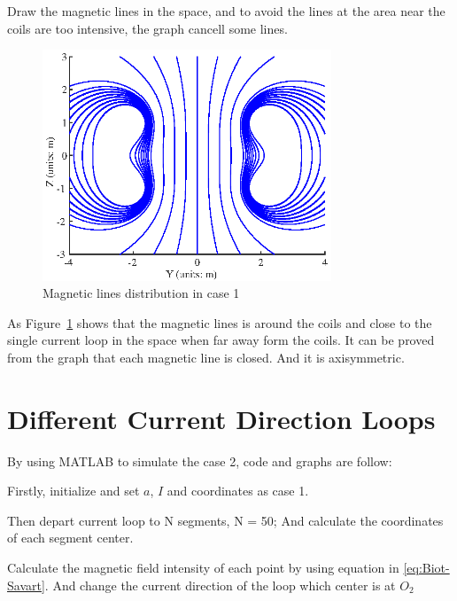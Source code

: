 \documentclass[10pt, journal, final]{IEEEtran}
\begin{document}
Draw the magnetic lines in the space, and to avoid the lines at the area near the coils are too intensive, 
the graph cancell some lines.


\begin{figure}[htbp]
    \centering
    \includegraphics[width = 3.4in]{figures-3/work1.3.eps}
    \caption{Magnetic lines distribution in case 1}
    \label{fig:1.3}
\end{figure}
As Figure~\ref{fig:1.3} shows that the magnetic lines is around the coils and close to the single current loop in the space
when far away form the coils. It can be proved from the graph that each magnetic line is closed. And it is axisymmetric.

\section{
  Different Current Direction Loops
 }
\label{sec: Diff Direction}
By using MATLAB to simulate the case 2, code and graphs are follow:\par

Firstly, initialize and set $a$, $I$ and coordinates as case 1.


Then depart current loop to N segments, N = 50;
And calculate the coordinates of each segment center.


Calculate the magnetic field intensity of each point by using equation in \ref{eq:Biot-Savart}. And change 
the current direction of the loop which center is at $O_2$ 

\end{document}
